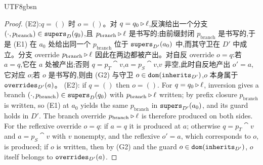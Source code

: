 \begin{CJK*}{UTF8}{gbsn}
\begin{proof}
\ifPaperChinese
(E2):$q = ()$ 时 $o = ()$。对 $q = q_0 \mathbin{\triangleright} \ell$,反演给出一个分支 $(\cdot, p_{\mathrm{branch}}) \in \mathtt{supers}_D(q_0)$,且 $p_{\mathrm{branch}} \mathbin{\triangleright} \ell$ 是书写的;由前缀封闭 $p_{\mathrm{branch}}$ 是书写的,于是 (E1) 在 $a_0$ 处给出同一个 $p_{\mathrm{branch}}$ 位于 $\mathtt{supers}_{D'}(a_0)$ 中,而其守卫在 $D'$ 中成立。分支 override $p_{\mathrm{branch}} \mathbin{\triangleright} \ell$ 因此在两边都被产出。对自反 override $o = q$:若 $a = q$,它在 $a$ 处被产出;否则 $q = p_T \cat v$,$a = p_S \cat v$,$v$ 非空,此时自反地产出 $o' = a$,它对应 $o$;若 $o$ 是书写的,则由 (G2) 与守卫 $o \in \mathtt{dom}(\mathtt{inherits}_{D'})$,$o$ 本身属于 $\mathtt{overrides}_{D'}(a)$。
\else
(E2): if $q = ()$ then $o = ()$. For $q = q_0 \mathbin{\triangleright} \ell$, inversion gives a branch
$(\cdot, p_{\mathrm{branch}}) \in \mathtt{supers}_D(q_0)$ with $p_{\mathrm{branch}} \mathbin{\triangleright} \ell$ written; by prefix
closure $p_{\mathrm{branch}}$ is written, so (E1) at $a_0$ yields the same $p_{\mathrm{branch}}$ in
$\mathtt{supers}_{D'}(a_0)$, and its guard holds in $D'$. The branch override $p_{\mathrm{branch}} \mathbin{\triangleright} \ell$ is
therefore produced on both sides. For the reflexive override $o = q$: if $a = q$ it is produced at $a$;
otherwise $q = p_T \cat v$ and $a = p_S \cat v$ with $v$ nonempty, and the reflexive $o' = a$, which
corresponds to $o$, is produced; if $o$ is written, then by (G2) and the guard
$o \in \mathtt{dom}(\mathtt{inherits}_{D'})$, $o$ itself belongs to $\mathtt{overrides}_{D'}(a)$.
\fi


\end{proof}
\end{CJK*}

